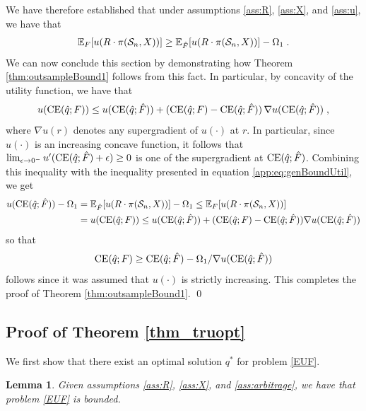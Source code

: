 \documentclass[]{interact}
\theoremstyle{plain}%
\newtheorem{lemma}[theorem]{Lemma}
\theoremstyle{definition}
\theoremstyle{remark}
\def\Expect{{\mathbb E}}
\newcommand{\0}{\V{0}}
\newcommand{\1}{\V{1}}
\newcommand{\Halmos}{{\qed}}
\newcommand{\modified}[1]{{\color{blue} #1}}
\def\CE{\mathop{\rm CE}}
\theoremstyle{plain}
\theoremstyle{definition}
\begin{document}
We have therefore established that under assumptions \ref{ass:R}, \ref{ass:X}, and \ref{ass:u}, we have that
\begin{eqnarray}
    \Expect_{\F}[u(R\cdot\investA(\Sn,X))] \geq \Expect_{\hat\F}[u(R\cdot\investA(\Sn,X))] - \Omega_1\;.\label{app:eq:genBoundUtil}
\end{eqnarray}
 We can now conclude this section by demonstrating how Theorem \ref{thm:outsampleBound1} follows
from this fact. In particular, by concavity of the utility
function, we have that
\[
  u(\CE(\qhat;\F))\leq u(\CE(\qhat;\Fhat))+(\CE(\qhat;\F)-\CE(\qhat;\Fhat))\,\nabla
  u(\CE(\qhat;\Fhat))\;,
\] 
where $\nabla u(r)$ denotes any supergradient of $u(\cdot)$ at $r$. In particular, since
$u(\cdot)$ is an increasing concave function, it follows that
$\lim_{\epsilon\to0^-}u'(\CE(\qhat;\Fhat)+\epsilon)\geq 0$ is one of the supergradient at
$\CE(\qhat;\Fhat)$. Combining this inequality with the inequality presented in equation \eqref{app:eq:genBoundUtil}, we get
\begin{align*}
  u(\CE(\qhat;\Fhat)) - \Omega_1 &=  \Expect_{\hat\F}[u(R\cdot\investA(\Sn,X))] - \Omega_1 \leq   \Expect_{\F}[u(R\cdot\investA(\Sn,X))] \\
  &= u(\CE(\qhat;\F)) \leq
  u(\CE(\qhat;\Fhat))+(\CE(\qhat;\F)-\CE(\qhat;\Fhat))\nabla u(\CE(\qhat;\Fhat))
\end{align*}
so that
\[
  \CE(\qhat;\F) \geq \CE(\qhat;\Fhat) - \Omega_1/\nabla u(\CE(\qhat;\Fhat))
\]
follows since it was assumed that $u(\cdot)$ is strictly increasing. This completes the
proof of Theorem \ref{thm:outsampleBound1}. \Halmos



%
\subsection{\modified{Proof of Theorem \ref{thm_truopt}}}\label{app:thm_truopt}

We first show that there exist an optimal solution $q^*$ for problem \eqref{EUF}.

\begin{lemma}\label{thm:qstarBound}
Given assumptions \ref{ass:R}, \ref{ass:X}, and \ref{ass:arbitrage}, we have that problem \eqref{EUF} is bounded.
\end{lemma}
\end{document}
